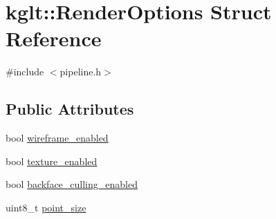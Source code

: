 \hypertarget{structkglt_1_1_render_options}{\section{kglt\-:\-:Render\-Options Struct Reference}
\label{structkglt_1_1_render_options}
}


{\ttfamily \#include $<$pipeline.\-h$>$}

\subsection*{Public Attributes}
\begin{DoxyCompactItemize}
\item 
bool \hyperlink{structkglt_1_1_render_options_af31dea05738969d557ef9a50c424e805}{wireframe\-\_\-enabled}
\item 
bool \hyperlink{structkglt_1_1_render_options_a8549cb8de46d5daa268dbcc89bb95d6e}{texture\-\_\-enabled}
\item 
bool \hyperlink{structkglt_1_1_render_options_ab3a22d50e9d251c07c873de3e9f0aa24}{backface\-\_\-culling\-\_\-enabled}
\item 
uint8\-\_\-t \hyperlink{structkglt_1_1_render_options_a5c14412ac530a7e1c5bfb85a3b128946}{point\-\_\-size}
\end{DoxyCompactItemize}


